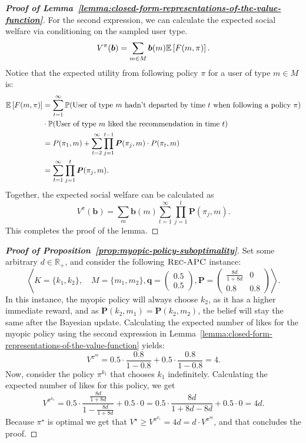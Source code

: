 \begin{proof}[\normalfont\bfseries Proof of Lemma~\ref{lemma:closed-form-representations-of-the-value-function}]
    For the second expression, we can calculate the expected social welfare via conditioning on the sampled user type.
    \[
    V^\pi(\bm b) = \sum_{m \in M}\bm b(m) \mathbb{E}\left[ F(m,\pi) \right].
    \]
    Notice that the expected utility from following policy $\pi$ for a user of type $m \in M$ is:
    \begin{align*}
        \mathbb{E}\left[ F(m,\pi) \right] &= \sum_{t=1}^{\infty} \mathbb{P}(\text{User of type } m \text{ hadn't departed by time } t \text{ when following a policy } \pi) \\
        &\cdot \mathbb{P}(\text{User of type } m \text{ liked the recommendation in time } t) \\
        &= P(\pi_1, m) + \sum_{t=2}^{\infty} \prod_{j=1}^{t-1} \bm P(\pi_j, m) \cdot P(\pi_t, m) \\
        &= \sum_{t=1}^{\infty} \prod_{j=1}^{t} \bm{P}(\pi_j, m).
    \end{align*}
    Together, the expected social welfare can be calculated as
    \[
        V^\pi(\bm b) = \sum_{m} \bm{b}(m) \sum_{t=1}^{\infty} \prod_{j=1}^{t} \bm{P}(\pi_j, m).
    \]
This completes the proof of the lemma.
\end{proof}

\begin{proof}[\normalfont\bfseries Proof of Proposition~\ref{prop:myopic-policy-suboptimality}]
    Set some arbitrary $d \in \mathbb{R_+}$, and consider the following $\textsc{Rec-APC}$ instance:
    \[
        \left\langle
        K = \{ k_1, k_2 \}, \quad M = \{ m_1, m_2 \},
        \bm q = \begin{pmatrix}
            0.5 \\
            0.5
        \end{pmatrix},
        \bm P = \begin{pmatrix}
            \frac{8d}{1+8d} & 0   \\
            0.8             & 0.8
        \end{pmatrix}
        \right\rangle.
    \]
    In this instance, the myopic policy will always choose $k_2$, as it has a higher immediate reward, and as $\bm{P}(k_2, m_1) = \bm{P}(k_2, m_2)$, the belief will stay the same after the Bayesian update.
    Calculating the expected number of likes for the myopic policy using the second expression in Lemma~\ref{lemma:closed-form-representations-of-the-value-function} yields:
    \[
        V^{\pi^m} = 0.5 \cdot \frac{0.8}{1-0.8} + 0.5 \cdot \frac{0.8}{1-0.8} = 4.
    \]
    Now, consider the policy $\pi^{k_1}$ that chooses $k_1$ indefinitely.
    Calculating the expected number of likes for this policy, we get
    \[
        V^{\pi^{k_1}} = 0.5 \cdot \frac{\frac{8d}{1+8d}}{1-\frac{8d}{1+8d}} + 0.5 \cdot 0 = 0.5 \cdot \frac{8d}{1+8d-8d} + 0.5 \cdot 0 = 4d.
    \]
    Because $\pi^\star$ is optimal we get that $V^\star \geq V^{\pi^{k_1}} = 4d = d \cdot V^{\pi^m}$, and that concludes the proof.
\end{proof}